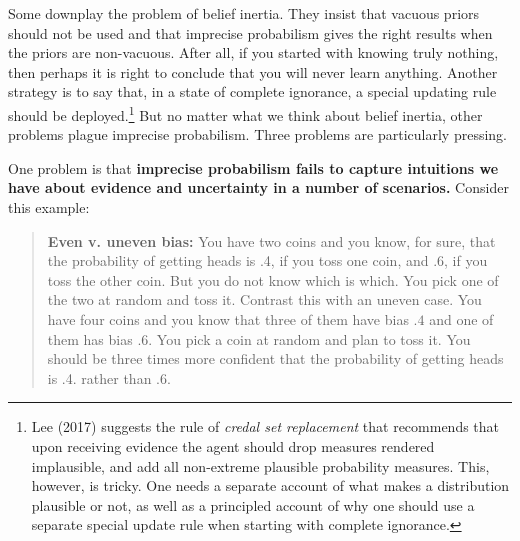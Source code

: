 \documentclass[
  letterpaper,
  DIV=11,
  numbers=noendperiod]{scrartcl}
\begin{document}
Some downplay the problem of belief inertia. They insist that vacuous
priors should not be used and that imprecise probabilism gives the right
results when the priors are non-vacuous. After all, if you started with
knowing truly nothing, then perhaps it is right to conclude that you
will never learn anything. Another strategy is to say that, in a state
of complete ignorance, a special updating rule should be
deployed.\footnote{Lee (2017) suggests the rule of
  \emph{credal set replacement} that recommends that upon receiving
  evidence the agent should drop measures rendered implausible, and add
  all non-extreme plausible probability measures. This, however, is
  tricky. One needs a separate account of what makes a distribution
  plausible or not, as well as a principled account of why one should
  use a separate special update rule when starting with complete
  ignorance.} But no matter what we think about belief inertia, other
problems plague imprecise probabilism. Three problems are particularly
pressing.

One problem is that \textbf{imprecise probabilism fails to capture
intuitions we have about evidence and uncertainty in a number of
scenarios.} Consider this example:

\begin{quote}
\textbf{Even v. uneven bias:}
 You have two coins and you know, for sure, that the probability of getting heads is .4, if you toss one coin, and .6, if you toss the other coin. But you do not know which is which. You pick one of the two at random and toss it.  Contrast this with an uneven case. You have four coins and you know that three of them have bias $.4$ and one of them has bias $.6$. You pick a coin at random and plan to toss it. You should be three times more confident that the probability of getting heads is .4. rather than .6.
\end{quote}
\end{document}
